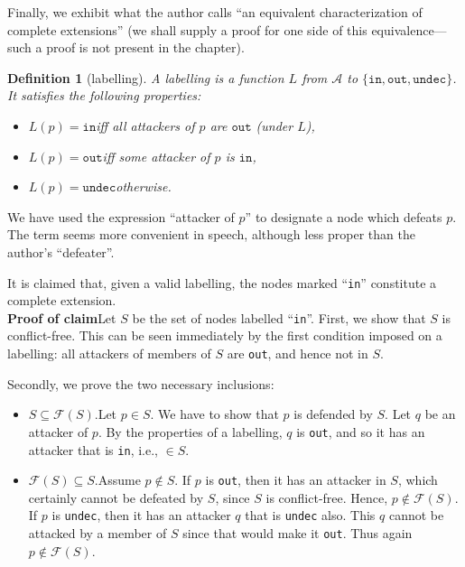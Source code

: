 \documentclass[12pt, a4paper]{article}
\newtheorem{Def}{Definition}[subsection]
\begin{document}
Finally, we exhibit what the author calls ``an equivalent characterization of complete extensions'' (we shall supply a proof for one side of this equivalence---such a proof is not present in the chapter).
\begin{Def}[labelling]
\sloppy A labelling is a function $L$ from $\mathcal{A}$ to $ \{ \mathtt{in}, \mathtt{out}, \mathtt{undec} \} $. It satisfies the following properties:
\begin{itemize}
\item $L(p) = \mathtt{in}$\quad iff all attackers of $p$ are $\mathtt{out}$ (under $L$),
\item $L(p) = \mathtt{out}$\quad iff some attacker of $p$ is $\mathtt{in}$,
\item $L(p) = \mathtt{undec}$\quad otherwise.
\end{itemize}
\end{Def}
We have used the expression ``attacker of $p$'' to designate a node which defeats $p$. The term seems more convenient in speech, although less proper than the author's ``defeater''.

It is claimed that, given a valid labelling, the nodes marked ``\texttt{in}'' constitute a complete extension.\\

\noindent\textbf{Proof of claim}\quad Let $S$ be the set of nodes labelled ``\texttt{in}''. First, we show that $S$ is conflict-free. This can be seen immediately by the first condition imposed on a labelling: all attackers of members of $S$ are \texttt{out}, and hence not in $S$.

Secondly, we prove the two necessary inclusions:
\begin{itemize}
\item $S \subseteq \mathcal{F}(S)$.\quad Let $p \in S$. We have to show that $p$ is defended by $S$. Let $q$ be an attacker of $p$. By the properties of a labelling, $q$ is \texttt{out}, and so it has an attacker that is \texttt{in}, i.e., $\in S$.
\item $\mathcal{F}(S) \subseteq S$.\quad Assume $p \not\in S$. If $p$ is \texttt{out}, then it has an attacker in $S$, which certainly cannot be defeated by $S$, since $S$ is conflict-free. Hence, $p \not\in \mathcal{F}(S)$. If $p$ is \texttt{undec}, then it has an attacker $q$ that is \texttt{undec} also. This $q$ cannot be attacked by a member of $S$ since that would make it \texttt{out}. Thus again $p \not\in \mathcal{F}(S)$.
\end{itemize}
\end{document}
